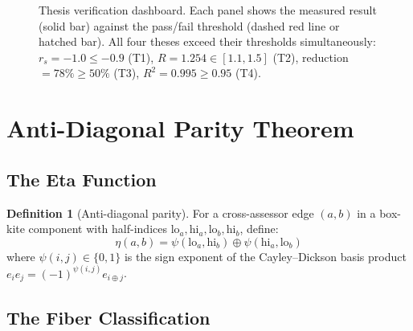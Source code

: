 \documentclass[12pt]{article}
\theoremstyle{definition}
\newtheorem{definition}{Definition}[section]
\theoremstyle{plain}
\theoremstyle{remark}
\begin{document}
\begin{figure}[t]
\caption{Thesis verification dashboard.  Each panel shows the measured
result (solid bar) against the pass/fail threshold (dashed red line or
hatched bar).  All four theses exceed their thresholds simultaneously:
$r_s = -1.0 \leq -0.9$ (T1), $R = 1.254 \in [1.1, 1.5]$ (T2),
reduction $= 78\% \geq 50\%$ (T3), $R^2 = 0.995 \geq 0.95$ (T4).}
\label{fig:thesis-dashboard}
\end{figure}

\section{Anti-Diagonal Parity Theorem}
\label{sec:apt}

\subsection{The Eta Function}
\label{sec:eta}

\begin{definition}[Anti-diagonal parity]
For a cross-assessor edge $(a,b)$ in a box-kite component with half-indices
$\mathrm{lo}_a, \mathrm{hi}_a, \mathrm{lo}_b, \mathrm{hi}_b$, define:
\begin{equation}
  \eta(a,b) = \psi(\mathrm{lo}_a, \mathrm{hi}_b)
              \oplus \psi(\mathrm{hi}_a, \mathrm{lo}_b)
  \label{eq:eta}
\end{equation}
where $\psi(i,j) \in \{0,1\}$ is the sign exponent of the Cayley--Dickson
basis product $e_i e_j = (-1)^{\psi(i,j)} e_{i \oplus j}$.
\end{definition}

\subsection{The Fiber Classification}
\label{sec:fiber}
\end{document}
